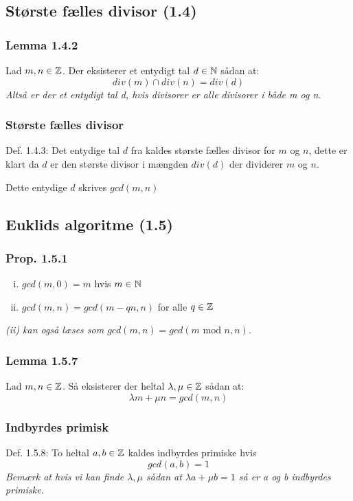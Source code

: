 \subsection{Største fælles divisor (1.4)}
\subsubsection{Lemma 1.4.2}
\label{1.4.2}
Lad $m, n \in \mathbb{Z}$. Der eksisterer et entydigt tal $d \in \mathbb{N}$ sådan at:
\begin{equation*}
  div(m) \cap div(n) = div(d)
\end{equation*}
\textit{Altså er der et entydigt tal d, hvis divisorer er alle divisorer i både
m og n}.

\subsubsection{Største fælles divisor}
\label{gcd}
Def. 1.4.3: Det entydige tal $d$ fra  kaldes største fælles
divisor for $m$ og $n$, dette er klart da $d$ er den største divisor i mængden
$div(d)$ der dividerer $m$ og $n$.

Dette entydige $d$ skrives $gcd(m,n)$


\subsection{Euklids algoritme (1.5)}
\subsubsection{Prop. 1.5.1}
\begin{enumerate}[(i)]
  \item $gcd(m,0) = m$ hvis $m \in \mathbb{N}$
  \item $gcd(m,n) = gcd(m - qn, n)$ for alle $q \in \mathbb{Z}$
\end{enumerate}
\textit{(ii) kan også læses som $gcd(m,n) = gcd(m \text{ mod } n, n)$}.

\subsubsection{Lemma 1.5.7}
\label{1.5.7}
Lad $m, n \in \mathbb{Z}$. Så eksisterer der heltal $\lambda, \mu \in \mathbb{Z}$ sådan at:
\begin{equation*}
  \lambda m + \mu n = gcd(m,n)
\end{equation*}

\subsubsection{Indbyrdes primisk}
\label{Indbyrdes primisk}
Def. 1.5.8: To heltal $a, b \in \mathbb{Z}$ kaldes indbyrdes primiske hvis
\begin{equation*}
  gcd(a,b) = 1
\end{equation*}
\textit{Bemærk at hvis vi kan finde $\lambda, \mu$ sådan at $\lambda a + \mu b
=1$ så er a og b indbyrdes primiske}.

